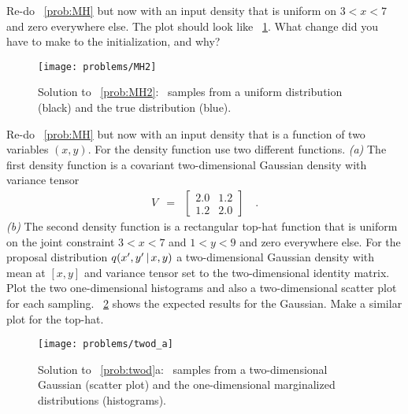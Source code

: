 \documentclass[modern]{aastex61}
\newcommand{\MCMC}{\acronym{MCMC}}
\begin{document}
\begin{problem}\label{prob:MH2}
Re-do \problemname~\ref{prob:MH} but now with an input density
that is uniform on $3<x<7$ and zero everywhere else.
The plot should look like \figurename~\ref{fig:MH2}.
What change did you have to make to the initialization, and why?
\end{problem}

\begin{figure}[!htbp]
\begin{center}
\texttt{[image: problems/MH2]}
\end{center}
\caption{Solution to \problemname~\ref{prob:MH2}:
\MCMC\ samples from a uniform distribution (black) and the true distribution
(blue).}
\label{fig:MH2}
\end{figure}

\begin{problem}\label{prob:twod}
Re-do \problemname~\ref{prob:MH} but now with an input density
that is a function of two variables $(x, y)$.
For the density function use two different functions.
\emph{(a)} The first density function is a covariant two-dimensional Gaussian
density with variance tensor
\begin{eqnarray}
V &=& \left[\begin{array}{cc} 2.0 & 1.2 \\ 1.2 & 2.0 \end{array}\right]
\quad.
\end{eqnarray}
\emph{(b)} The second density function is a rectangular top-hat function that
is uniform on the joint constraint $3<x<7$ and $1<y<9$ and zero everywhere else.
For the proposal distribution $q(x', y'\,|\, x, y)$ a two-dimensional Gaussian
density with mean at $[x, y]$ and variance tensor set to the two-dimensional
identity matrix.
Plot the two one-dimensional histograms and also a two-dimensional scatter
plot for each sampling.
\figurename~\ref{fig:twod-a} shows the expected results for the Gaussian.
Make a similar plot for the top-hat.
\end{problem}

\begin{figure}[!htbp]
\begin{center}
\texttt{[image: problems/twod\_a]}
\end{center}
\caption{Solution to \problemname~\ref{prob:twod}a:
\MCMC\ samples from a two-dimensional Gaussian (scatter plot) and the
one-dimensional marginalized distributions (histograms).}
\label{fig:twod-a}
\end{figure}
\end{document}
